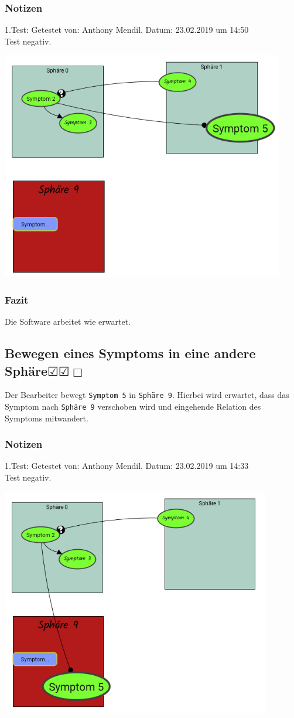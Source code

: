 \documentclass{scrartcl}
\newcommand{\subsectiont}[2]{\subsection[#1]{#1{\normalsize\normalfont #2}}}
\newcommand{\leer}{$\Box$}
\newcommand{\ok}{$\CheckedBox$}
\begin{document}
\subsubsection{Notizen}
1.Test: Getestet von: Anthony Mendil. Datum: 23.02.2019 um 14:50 \\
Test negativ.
\begin{center}
\includegraphics[height=10cm]{2_30.PNG}
\end{center}
\subsubsection{Fazit}
Die Software arbeitet wie erwartet.

\subsectiont{Bewegen eines Symptoms in eine andere Sphäre}{\dotfill\ok\ok\leer}
Der Bearbeiter bewegt \texttt{Symptom 5} in \texttt{Sphäre 9}. Hierbei wird erwartet, dass das Symptom nach \texttt{Sphäre 9} verschoben wird und eingehende Relation des Symptoms mitwandert. 
\subsubsection{Notizen}
1.Test: Getestet von: Anthony Mendil. Datum: 23.02.2019 um 14:33 \\
Test negativ.
\begin{center}
\includegraphics[height=10cm]{2_31.PNG}
\end{center}
\end{document}
